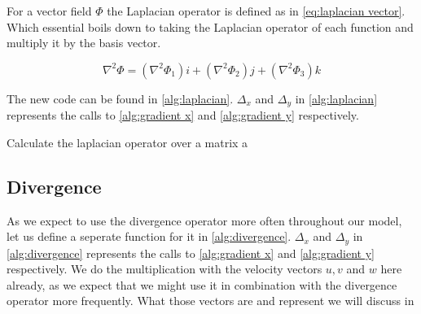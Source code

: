 For a vector field $\Phi$ the Laplacian operator is defined as in \autoref{eq:laplacian vector}. Which essential boils down to taking the Laplacian operator of each function and multiply it by
the basis vector.

\begin{equation}
    \nabla^2 \Phi = (\nabla^2 \Phi_1)i + (\nabla^2 \Phi_2)j + (\nabla^2 \Phi_3)k
    \label{eq:laplacian vector}
\end{equation}

The new code can be found in \autoref{alg:laplacian}. $\Delta_x$ and $\Delta_y$ in \autoref{alg:laplacian} represents the calls to \autoref{alg:gradient x} and \autoref{alg:gradient y} 
respectively.

\begin{algorithm}[hbt]
    
     \;
    \caption{Calculate the laplacian operator over a matrix a}
    \label{alg:laplacian}
\end{algorithm}

\subsection{Divergence}
As we expect to use the divergence operator more often throughout our model, let us define a seperate function for it in \autoref{alg:divergence}. $\Delta_x$ and $\Delta_y$ in 
\autoref{alg:divergence} represents the calls to \autoref{alg:gradient x} and \autoref{alg:gradient y} respectively. We do the multiplication with the velocity vectors $u, v$ and $w$ here already, 
as we expect that we might use it in combination with the divergence operator more frequently. What those vectors are and represent we will discuss in %

